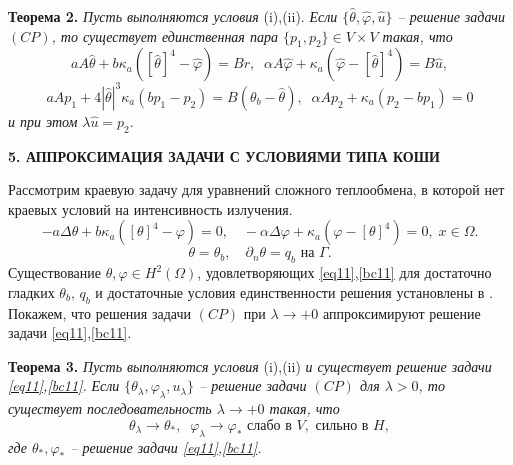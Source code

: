 \documentclass[12pt]{article}
\begin{document}
    \textbf{Теорема 2.}
    {\it
    Пусть выполняются условия} (i),(ii).
        {\it  Если $\{\hat{\theta}, \hat{\varphi}, \hat{u}\}$ -- решение
    задачи $(CP)$, то существует единственная пара $\{p_1, p_2 \} \in V\times V$
        такая, что}
    $$
    aA\hat{\theta} + b \kappa_a([\hat{\theta}]^4 -\hat{\varphi}) = Br, \;\;
    \alpha A \hat{\varphi} + \kappa_a(\hat{\varphi} - [\hat{\theta}]^4) = B\hat{u},
    $$
    $$
    aAp_1 +4|\hat{\theta}|^3 \kappa_a(bp_1 - p_2) = B(\theta_b - \hat{\theta}), \;\;
    \alpha A p_2 + \kappa_a (p_2 - b p_1) = 0
    $$
        {\it и при этом} $\lambda\hat{u} = p_2.$




    \begin{center}
        \textbf{5. АППРОКСИМАЦИЯ ЗАДАЧИ С УСЛОВИЯМИ ТИПА КОШИ}
    \end{center}


    Рассмотрим краевую задачу для уравнений сложного теплообмена, в которой нет краевых условий на
    интенсивность излучения.
    \begin{equation}
        \label{eq11}  - a\Delta\theta + b\kappa_a([\theta]^4- \varphi)=0,\quad
        -\alpha \Delta \varphi +
        \kappa_a(\varphi-[\theta]^4)=0,\; x\in\Omega.
    \end{equation}
    \begin{equation}
        \label{bc11} \theta=\theta_b,\quad \partial_n\theta = q_b \text{  на  }\Gamma.
    \end{equation}
    Существование $\theta,\varphi\in H^2(\Omega)$, удовлетворяющих \eqref{eq11},\eqref{bc11}
    для достаточно гладких
    $\theta_b,\, q_b$ и достаточные условия единственности решения
    установлены в \cite{CMMP20}. Покажем, что решения задачи $(CP)$ при $\lambda\to+0$
    аппроксимируют решение задачи \eqref{eq11},\eqref{bc11}.


    \textbf{Теорема 3.}
    {\it
    Пусть выполняются условия} (i),(ii) {\it и существует решение задачи \eqref{eq11},\eqref{bc11}.}
        {\it  Если $\{\theta_\lambda,\varphi_\lambda,u_\lambda\}$ -- решение
    задачи $(CP)$ для $\lambda>0$, то существует последовательность
        $\lambda\to +0$
        такая, что}
    \[
        \theta_\lambda\rightarrow\theta_*, \;\; \varphi_\lambda\rightarrow\varphi_*
        \text{ слабо в }V,\text{ сильно в }H,
    \]
        {\it где $\theta_*,\varphi_*$ -- решение задачи \eqref{eq11},\eqref{bc11}.}
\end{document}
